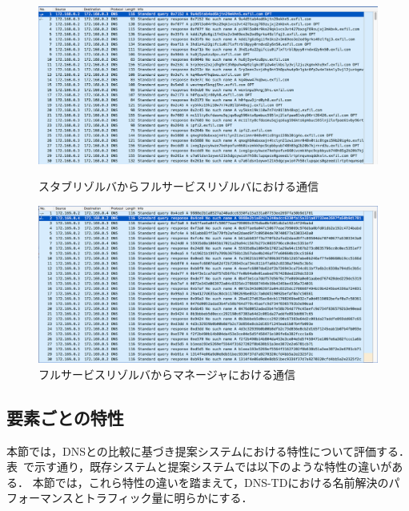 

\begin{figure}[p]
 \centering
 \includegraphics[width=14.5cm]{figure/stab-fullservice.png}
 \vspace{-1cm}
 \caption{スタブリゾルバからフルサービスリゾルバにおける通信}
 \label{fig:fullservice-manager}
 \vspace{1cm}
 \includegraphics[width=14.5cm]{figure/fullresolver-manager.png}
 \vspace{-1cm}
 \caption{フルサービスリゾルバからマネージャにおける通信}
 \label{fig:fullservice-manager}
\end{figure}

\newpage
\subsection{要素ごとの特性}
\label{sec:eval-feature}
本節では，DNSとの比較に基づき提案システムにおける特性について評価する．
表~\cite{tab:diff_feature}で示す通り，既存システムと提案システムでは以下のような特性の違いがある．
本節では，これら特性の違いを踏まえて，DNS-TDにおける名前解決のパフォーマンスとトラフィック量に明らかにする．


